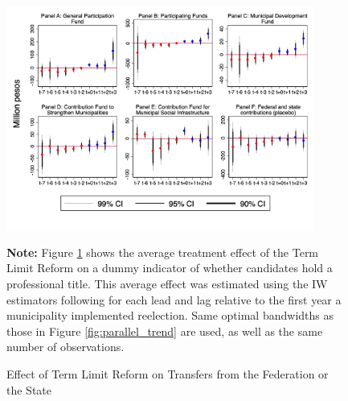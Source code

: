 \documentclass[12pt]{amsart}
\numberwithin{equation}{section}
\theoremstyle{definition}
\theoremstyle{definition}
\theoremstyle{definition}
\begin{document}
\begin{figure}[h]   
\centering
 \caption{Effect of Term Limit Reform on Transfers from the Federation or the State}
 \label{fig:resources2}
\includegraphics[width=0.9\textwidth]{../Figures/resouce_based_incumbency_allyears.png}
       \captionsetup{justification=centering}
         
 \textbf{Note:} Figure \ref{fig:resources2} shows the average treatment effect of the Term Limit Reform on a dummy indicator of whether candidates hold a professional title. This average effect was estimated using the IW estimators following \citet{abraham_sun_2020} for each lead and lag relative to the first year a municipality implemented reelection. Same optimal bandwidths as those in Figure \ref{fig:parallel_trend} are used, as well as the same number of observations.  
       
\end{figure}  
\end{document}
